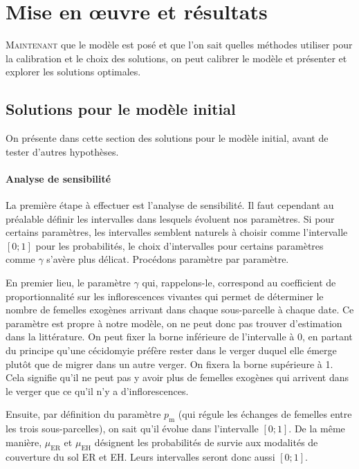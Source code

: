 \chapter{Mise en œuvre et résultats} 

\lettrine{M}{aintenant} que le modèle est posé et que l'on sait quelles méthodes utiliser pour la calibration et le choix des solutions, on peut calibrer le modèle et présenter et explorer les solutions optimales.

\section{Solutions pour le modèle initial}

On présente dans cette section des solutions pour le modèle initial, avant de tester d'autres hypothèses.

\subsubsection{Analyse de sensibilité}

La première étape à effectuer est l'analyse de sensibilité.
Il faut cependant au préalable définir les intervalles dans lesquels évoluent nos paramètres.
Si pour certains paramètres, les intervalles semblent naturels à choisir comme l'intervalle $[0; 1]$ pour les probabilités, le choix d'intervalles pour certains paramètres comme $\gamma$ s'avère plus délicat.
Procédons paramètre par paramètre.

En premier lieu, le paramètre $\gamma$ qui, rappelons-le, correspond au coefficient de proportionnalité sur les inflorescences vivantes qui permet de déterminer le nombre de femelles exogènes arrivant dans chaque sous-parcelle à chaque date.
Ce paramètre est propre à notre modèle, on ne peut donc pas trouver d'estimation dans la littérature.
On peut fixer la borne inférieure de l'intervalle à 0, en partant du principe qu'une cécidomyie préfère rester dans le verger duquel elle émerge plutôt que de migrer dans un autre verger.
On fixera la borne supérieure à 1. Cela signifie qu'il ne peut pas y avoir plus de femelles exogènes qui arrivent dans le verger que ce qu'il n'y a d'inflorescences.

Ensuite, par définition du paramètre $p_{\text{m}}$ (qui régule les échanges de femelles entre les trois sous-parcelles), on sait qu'il évolue dans l'intervalle $[0;1]$.
De la même manière, $\mu_{\text{ER}}$ et $\mu_{\text{EH}}$ désignent les probabilités de survie aux modalités de couverture du sol ER et EH.
Leurs intervalles seront donc aussi $[0;1]$.

